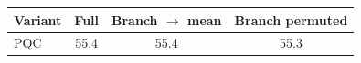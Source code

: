 \begin{tabular}{lccc}
\toprule
Variant & Full & Branch $\to$ mean & Branch permuted \\
\midrule
PQC & 55.4 & 55.4 & 55.3 \\
\bottomrule
\end{tabular}